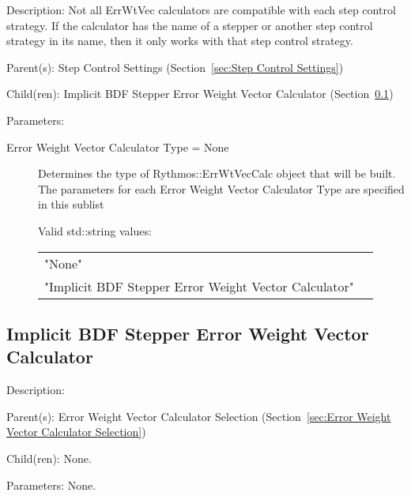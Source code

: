 \begin{list}{}
  {\setlength{\leftmargin}{1.0in}
   \setlength{\labelwidth}{0.75in}
   \setlength{\labelsep}{0.125in}}
  \item[Description:]
    Not all ErrWtVec calculators are compatible with each step control strategy.
    If the calculator has the name of a stepper or another step control strategy in
    its name, then it only works with that step control strategy.
  \item[Parent(s):]
    Step Control Settings (Section~\ref{sec:Step Control Settings})
  \item[Child(ren):]
    Implicit BDF Stepper Error Weight Vector Calculator (Section~\ref{sec:Implicit BDF Stepper Error Weight Vector Calculator})
  \item[Parameters:]
    \begin{description}
      \item[Error Weight Vector Calculator Type = None] 
Determines the type of Rythmos::ErrWtVecCalc object that will be built.
The parameters for each Error Weight Vector Calculator Type are specified in this sublist

  Valid std::string values:

      \begin{tabular}{lp{}}
      "None" & \\ 
      "Implicit BDF Stepper Error Weight Vector Calculator" & \\ 
      \end{tabular}
\end{description}

\end{list}

\subsection{Implicit BDF Stepper Error Weight Vector Calculator}
\label{sec:Implicit BDF Stepper Error Weight Vector Calculator}

\begin{list}{}
  {\setlength{\leftmargin}{1.0in}
   \setlength{\labelwidth}{0.75in}
   \setlength{\labelsep}{0.125in}}
  \item[Description:]
  \item[Parent(s):]
    Error Weight Vector Calculator Selection (Section~\ref{sec:Error Weight Vector Calculator Selection})
  \item[Child(ren):]
    None. 
  \item[Parameters:]
    None. 
\end{list}

